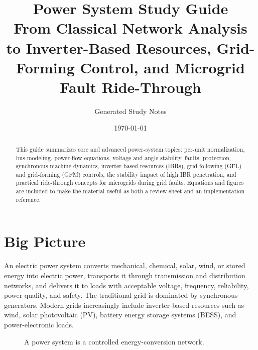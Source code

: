 \documentclass[11pt]{article}
\title{\textbf{Power System Study Guide}\\
\large From Classical Network Analysis to Inverter-Based Resources, Grid-Forming Control, and Microgrid Fault Ride-Through}
\author{Generated Study Notes}
\date{\today}
\begin{document}
\maketitle

\begin{abstract}
This guide summarizes core and advanced power-system topics: per-unit
normalization, bus modeling, power-flow equations, voltage and angle stability,
faults, protection, synchronous-machine dynamics, inverter-based resources
(IBRs), grid-following (GFL) and grid-forming (GFM) controls, the stability
impact of high IBR penetration, and practical ride-through concepts for
microgrids during grid faults. Equations and figures are included to make the
material useful as both a review sheet and an implementation reference.
\end{abstract}

\tableofcontents
\newpage

\section{Big Picture}

An electric power system converts mechanical, chemical, solar, wind, or stored
energy into electric power, transports it through transmission and distribution
networks, and delivers it to loads with acceptable voltage, frequency,
reliability, power quality, and safety. The traditional grid is dominated by
synchronous generators. Modern grids increasingly include inverter-based
resources such as wind, solar photovoltaic (PV), battery energy storage systems
(BESS), and power-electronic loads.

\begin{figure}[h]
\centering
{}
\caption{A power system is a controlled energy-conversion network.}
\end{figure}
\end{document}
